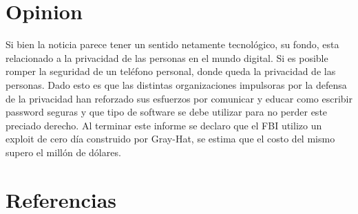 \documentclass[12pt,letterpaper]{article}
\begin{document}
\section{Opinion}
Si bien la noticia parece tener un sentido netamente tecnológico, su fondo, esta relacionado a la privacidad de las personas en el mundo digital. Si es posible romper la seguridad de un teléfono personal, donde queda la privacidad de las personas. Dado esto es que las distintas organizaciones impulsoras por la defensa de la privacidad han reforzado sus esfuerzos por comunicar y educar como escribir password seguras y que tipo de software se debe utilizar para no perder este preciado derecho.
Al terminar este informe se declaro que el FBI utilizo un exploit de cero día construido por Gray-Hat\autocite{web:2}, se estima que el costo del mismo supero el millón de dólares. 

\section{Referencias\label{sec:references}}

\printbibliography[heading=none]
\end{document}
